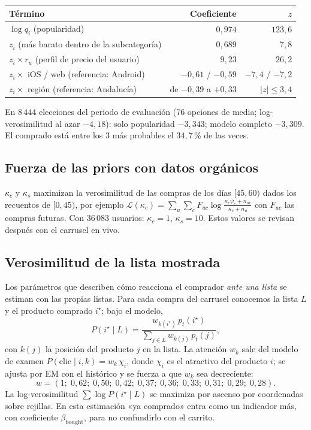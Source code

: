 \documentclass[11pt,a4paper]{article}
\begin{document}
\begin{center}
\begin{tabular}{lrr}
\toprule
Término & Coeficiente & $z$\\
\midrule
$\log q_i$ (popularidad) & $0{,}974$ & $123{,}6$\\
$z_i$ (más barato dentro de la subcategoría) & $0{,}689$ & $7{,}8$\\
$z_i\times r_u$ (perfil de precio del usuario) & $9{,}23$ & $26{,}2$\\
$z_i\times$ iOS \;/\; web (referencia: Android) & $-0{,}61$ \;/\; $-0{,}59$ & $-7{,}4$ \;/\; $-7{,}2$\\
$z_i\times$ región (referencia: Andalucía) & de $-0{,}39$ a $+0{,}33$ & $|z|\le 3{,}4$\\
\bottomrule
\end{tabular}
\end{center}

En $8\,444$ elecciones del periodo de evaluación (76 opciones de media; log-verosimilitud al azar
$-4{,}18$): solo popularidad $-3{,}343$; modelo completo $-3{,}309$. El comprado está entre los 3 más
probables el $34{,}7$\,\% de las veces.

\subsection{Fuerza de las priors con datos orgánicos}

$\kappa_c$ y $\kappa_s$ maximizan la verosimilitud de las compras de los días $[45,60)$ dados los
recuentos de $[0,45)$, por ejemplo
$\mathcal L(\kappa_c)=\sum_u\sum_c F_{uc}\log\frac{\kappa_c\psi_c+n_{uc}}{\kappa_c+n_u}$ con $F_{uc}$ las compras
futuras. Con $36\,083$ usuarios: $\kappa_c=1$, $\kappa_s=10$. Estos valores se revisan después con el
carrusel en vivo.

\subsection{Verosimilitud de la lista mostrada}\label{sec:lista}

Los parámetros que describen cómo reacciona el comprador \emph{ante una lista} se estiman con las
propias listas. Para cada compra del carrusel conocemos la lista $L$ y el producto comprado $i^\star$; bajo
el modelo,
\begin{equation}
P(i^\star\mid L)=\frac{w_{k(i^\star)}\,p_t(i^\star)}{\sum_{j\in L}w_{k(j)}\,p_t(j)}, \label{eq:lista}
\end{equation}
con $k(j)$ la posición del producto $j$ en la lista. La atención $w_k$ sale del modelo de examen
$P(\text{clic}\mid i,k)=w_k\,\chi_i$, donde $\chi_i$ es el atractivo del producto $i$; se ajusta por EM con
el histórico y se fuerza a que $w_k$ sea decreciente:
\[
w=(1;\;0{,}62;\;0{,}50;\;0{,}42;\;0{,}37;\;0{,}36;\;0{,}33;\;0{,}31;\;0{,}29;\;0{,}28).
\]
La log-verosimilitud
$\sum\log P(i^\star\mid L)$ se maximiza por ascenso por coordenadas sobre rejillas. En esta estimación «ya
comprado» entra como un indicador más, con coeficiente $\beta_{\text{bought}}$, para no confundirlo
con el carrito.
\end{document}
